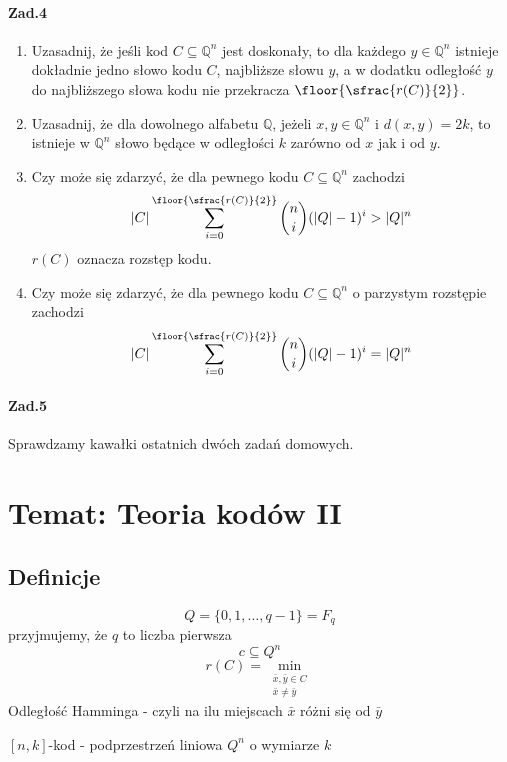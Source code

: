\paragraph{Zad.4}
\begin{enumerate}[label=\alph*)]
\item Uzasadnij, że jeśli kod $C \subseteq \mathbb{Q}^n$ jest doskonały, to dla każdego $y\in \mathbb{Q}^n$ istnieje dokładnie jedno słowo kodu $C$, najbliższe słowu $y$, a w dodatku odległość $y$ do najbliższego słowa kodu nie przekracza $\floor{\sfrac{r(C)}{2}}$.
\item Uzasadnij, że dla dowolnego alfabetu $\mathbb{Q}$, jeżeli $x,y\in \mathbb{Q}^n$ i $d(x, y) = 2k$, to istnieje w $\mathbb{Q}^n$ słowo będące w odległości $k$ zarówno od $x$ jak i od $y$.
\item Czy może się zdarzyć, że dla pewnego kodu $C \subseteq \mathbb{Q}^n$ zachodzi
$$|C|\sum_{i=0}^{\floor{\sfrac{r(C)}{2}}}\binom{n}{i}(|Q|-1)^i>|Q|^n$$
$r(C)$ oznacza rozstęp kodu.
\item Czy może się zdarzyć, że dla pewnego kodu $C \subseteq \mathbb{Q}^n$ o parzystym rozstępie zachodzi
$$|C|\sum_{i=0}^{\floor{\sfrac{r(C)}{2}}}\binom{n}{i}(|Q|-1)^i=|Q|^n$$
\end{enumerate}

\paragraph{Zad.5} Sprawdzamy kawałki ostatnich dwóch zadań domowych.


\section[Wykład 11: 25-V-2017 - Temat: Teoria kodów II]{Temat: Teoria kodów II}
\subsection{Definicje}
$$Q=\{0,1,\dots,q-1\}=F_q$$
przyjmujemy, że $q$ to liczba pierwsza
$$c\subseteq Q^n$$
$$r(C)=\min_{\begin{matrix}
\bar{x},\bar{y}\in C\\
\bar{x}\neq\bar{y}
\end{matrix}}$$
Odległość Hamminga - czyli na ilu miejscach $\bar{x}$ różni się od $\bar{y}$

$[n,k]$-kod - podprzestrzeń liniowa $Q^n$ o wymiarze $k$


